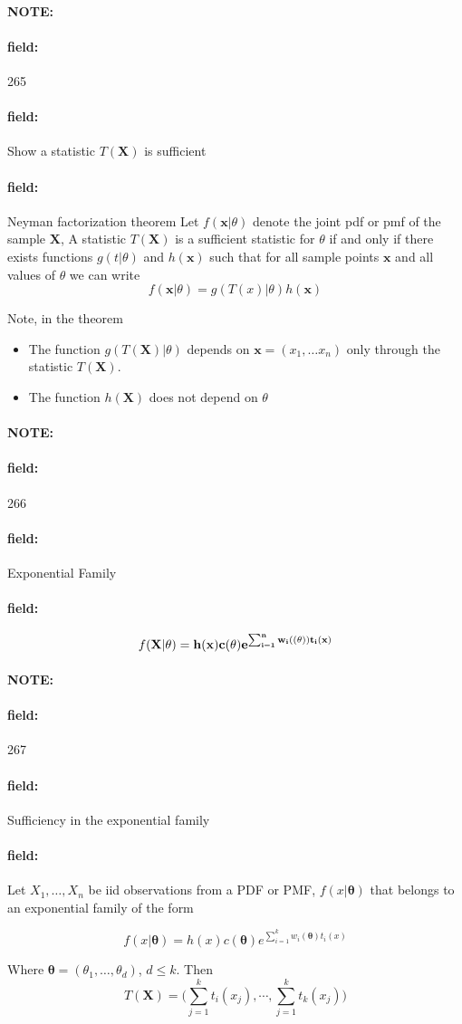 \documentclass[12pt]{article}
\newenvironment{note}{\paragraph{NOTE:}}{}
\newenvironment{field}{\paragraph{field:}}{}
\begin{document}
\begin{note} \begin{field} \tiny 265 \end{field}
  \begin{field}
    Show a statistic $T(\mathbf{X})$ is sufficient
  \end{field}
  \begin{field}
    Neyman factorization theorem
    Let $f(\mathbf{x}|\theta)$ denote the joint pdf or pmf of the sample $\mathbf{X}$, A statistic $T(\mathbf{X})$ is a sufficient statistic for $\theta$ if and only if there exists functions $g(t|\theta)$ and $h(\mathbf{x})$ such that for all sample points $\mathbf{x}$ and all values of $\theta$ we can write
    $$ f(\mathbf{x}|\theta) = g(T(\mathbf{}x)|\theta)h(\mathbf{x})$$

    Note, in the theorem
    \begin{itemize}
      \item The function $g(T(\mathbf{X})|\theta)$ depends on $\mathbf{x} = (x_1, \ldots x_n)$ only through the statistic $T(\mathbf{X})$.
      \item The function $h(\mathbf{X})$ does not depend on $\theta$
    \end{itemize}
  \end{field}
\end{note}

\begin{note} \begin{field} \tiny 266 \end{field}
  \begin{field}
    Exponential Family
  \end{field}
  \begin{field}
    $$f(\mathbf{X}|\bf{\theta}) = h(\mathbf{x})c(\mathbf{\theta})e^{\sum _{i = 1}^n w_i(\bf(\theta))t_i(x)}$$
  \end{field}
\end{note}




\begin{note} \begin{field} \tiny 267 \end{field}
  \begin{field}
    Sufficiency in the exponential family
  \end{field}
  \begin{field}
    Let $X_1, \ldots , X_n$ be iid observations from a PDF or PMF, $f(x|\boldsymbol\theta)$ that belongs to an exponential family of the form

    $$ f(x|\boldsymbol\theta) = h(x)c(\boldsymbol\theta)e^{\sum _{i = 1}^k w_i(\boldsymbol\theta)t_i(x)}$$

    Where $\boldsymbol\theta = (\theta_1, \ldots, \theta_d)$, $d\leq k$. Then
    $$ T(\mathbf{X}) = \big(\sum _{j = 1}^k t_i(x_j), \cdots , \sum _{j = 1}^k t_k(x_j)\big)$$
  \end{field}
\end{note}
\end{document}
